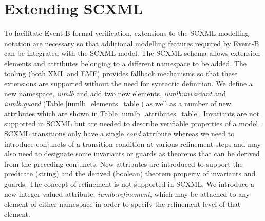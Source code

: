 
\section{Extending SCXML}
\label{sect:extension}


To facilitate Event-B formal verification, extensions to the SCXML 
modelling notation are necessary so that additional modelling features 
required by Event-B can be integrated with the SCXML model.
The SCXML schema allows extension elements and attributes belonging 
to a different namespace to be added. The tooling (both XML and EMF) 
provides fallback mechanisms so that these extensions are supported 
without the need for syntactic definition. We define a new namespace,  
\emph{iumlb} and add two new elements, \emph{iumlb:invariant} and 
\emph{iumlb:guard} (Table \ref{iumlb_elements_table}) as well as a 
number of new attributes which are shown in Table \ref{iumlb_attributes_table}.
Invariants are not supported in SCXML but are needed to describe 
verifiable properties of a model. SCXML transitions only have a single 
\emph{cond} attribute whereas we need to introduce conjuncts of a transition
condition at various refinement steps and may also need to designate some 
invariants or guards as theorems that can be derived from the preceding conjuncts. 
New attributes are introduced to support the predicate (string) and the 
derived (boolean) theorem property of invariants and guards. The concept 
of refinement is not supported in SCXML. We introduce a new integer valued 
attribute, \emph{iumlb:refinement}, which may be attached to any element of 
either namespace in order to specify the refinement level of that element. 



